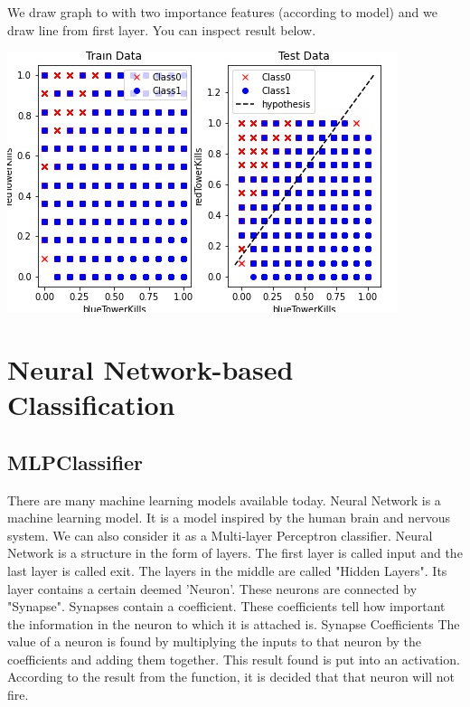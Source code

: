\documentclass[a4paper]{article}
\begin{document}
We draw graph to with two importance features (according to model) and we draw line from first layer. You can inspect result below.

\medskip

\includegraphics[width=.9\linewidth]{graphs/sgdclassifier_decision_boundary.jpeg}


\bigskip 

\pagebreak

\section{ Neural Network-based Classification}

\subsection{MLPClassifier}

There are many machine learning models available today. Neural Network is a machine learning model. It is a model inspired by the human brain and nervous system. We can also consider it as a Multi-layer Perceptron classifier. Neural Network is a structure in the form of layers. The first layer is called input and the last layer is called exit. The layers in the middle are called "Hidden Layers". Its layer contains a certain deemed 'Neuron'. These neurons are connected by "Synapse". Synapses contain a coefficient. These coefficients tell how important the information in the neuron to which it is attached is. Synapse Coefficients The value of a neuron is found by multiplying the inputs to that neuron by the coefficients and adding them together. This result found is put into an activation. According to the result from the function, it is decided that that neuron will not fire.
\end{document}
